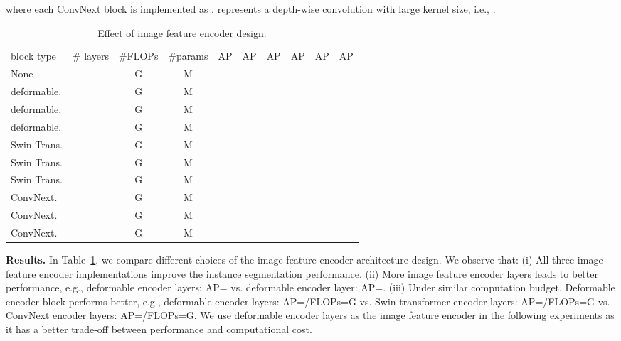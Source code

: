 \documentclass[10pt,twocolumn,letterpaper]{article}
\begin{document}
where each ConvNext block is implemented as .  represents a depth-wise convolution with large kernel size, i.e., .

\begin{table}[t]
\begin{minipage}[t]{1\linewidth}
\vspace{2mm}
\centering
\setlength{\tabcolsep}{2pt}
\footnotesize
\renewcommand{\arraystretch}{1.2}
\resizebox{1.0\linewidth}{!}
{
\begin{tabular}{l|c|c|c|cccccc}
block type & \# layers  & \#FLOPs & \#params & AP & AP & AP & AP & AP & AP \\
\shline
None &   &  G &  M &  &  &  &  &   &  \\\hline
deformable. &   &  G &  M &  &  &  &  &  &   \\
\rowcolor{gray!10}deformable. &   &  G &  M &  &  &  &  &  &   \\
deformable. &   &  G &  M &  &  &  &  &  &  \\\hline
Swin Trans. &    &  G &  M &  &  &  &  &  &   \\
Swin Trans. &    &  G &  M &  &  &  &  &  &  \\
Swin Trans. &    &  G &  M & &  &  &  &  &  \\\hline
ConvNext. &   &  G &  M &  &  &  &  &  &    \\
ConvNext. &   &  G &  M &  &  &  &  &  &   \\
ConvNext. &   &  G &  M &  &  &  &  &  &  \\
\end{tabular}
}
\caption{\small{{
Effect of image feature encoder design.}}
}
\label{tab:feat_enc_ablate}
\end{minipage}
\end{table}

\vspace{1mm}
\noindent\textbf{Results.}
In Table~\ref{tab:feat_enc_ablate}, we compare different choices of the image feature encoder architecture design. We observe that: (i) All three image feature encoder implementations improve the instance segmentation performance. (ii) More image feature encoder layers leads to better performance, e.g.,  deformable encoder layers: AP= vs.  deformable encoder layer: AP=. (iii) Under similar computation budget, Deformable encoder block performs better, e.g.,  deformable encoder layers: AP=/FLOPs=G vs.  Swin transformer encoder layers: AP=/FLOPs=G vs.  ConvNext encoder layers: AP=/FLOPs=G. We use  deformable encoder layers as the image feature encoder in the following experiments as it has a better trade-off between performance and computational cost.
\end{document}
